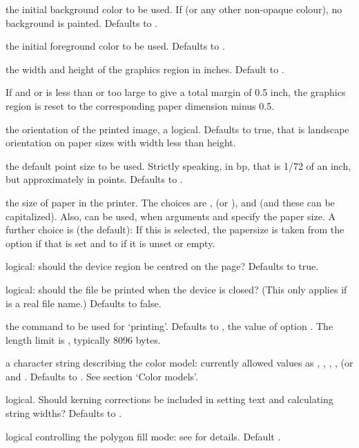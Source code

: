 \begin{Arguments}
\begin{ldescription}
\item[\code{bg}] the initial background color to be used.  If
 (or any other non-opaque colour), no background
is painted.  Defaults to .
\item[\code{fg}] the initial foreground color to be used.  Defaults to
.
\item[\code{width, height}] the width and height of the graphics region in
inches.  Default to .

If  and  or  is less
than  or too large to give a total margin of 0.5 inch, the
graphics region is reset to the corresponding paper dimension minus 0.5.

\item[\code{horizontal}] the orientation of the printed image, a logical.
Defaults to true, that is landscape orientation on paper sizes
with width less than height.
\item[\code{pointsize}] the default point size to be used.  Strictly
speaking, in bp, that is 1/72 of an inch, but approximately in
points.  Defaults to .
\item[\code{paper}] the size of paper in the printer.  The choices are
,  (or ),  and
 (and these can be capitalized).
Also,  can be used, when arguments 
and  specify the paper size.  A further choice is
 (the default): If this is selected, the papersize
is taken from the option  if that is set and to
 if it is unset or empty.
\item[\code{pagecentre}] logical: should the device region be centred on the
page?  Defaults to true.
\item[\code{print.it}] logical: should the file be printed when the device is
closed?  (This only applies if  is a real file name.)
Defaults to false.
\item[\code{command}] the command to be used for `printing'.  Defaults
to , the value of option .  The
length limit is ,
typically 8096 bytes.

\item[\code{colormodel}] a character string describing the color model:
currently allowed values as , ,
, ,  (or  and
.  Defaults to .  See section
`Color models'.
\item[\code{useKerning}] logical.  Should kerning corrections be included in
setting text and calculating string widths?  Defaults to .
\item[\code{fillOddEven}] logical controlling the polygon fill mode:  see
 for details.  Default .   
\end{ldescription}
\end{Arguments}
